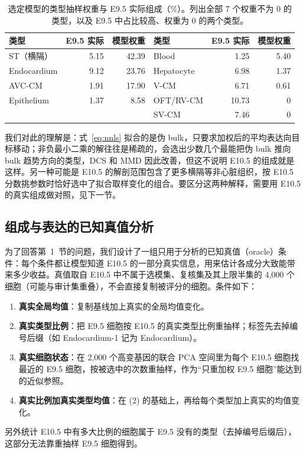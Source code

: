 \documentclass[UTF8,zihao=-4,fontset=none,a4paper]{ctexart}
\newcommand{\smalltable}{\small\renewcommand{\arraystretch}{1.2}}
\begin{document}
\begin{table}[t]
\centering\smalltable
\caption{选定模型的类型抽样权重与 E9.5 实际组成（\%）。列出全部 7 个权重不为 0 的类型，以及 E9.5 中占比较高、权重为 0 的两个类型。}\label{tab:weights}
\begin{tabular}{@{}lrr@{\hspace{2.2em}}lrr@{}}
\toprule
类型 & E9.5 实际 & 模型权重 & 类型 & E9.5 实际 & 模型权重\\
\midrule
ST（横隔） & 5.15 & 42.39 & Blood & 1.25 & 5.40\\
Endocardium & 9.12 & 23.76 & Hepatocyte & 6.98 & 1.37\\
AVC-CM & 1.91 & 17.90 & V-CM & 6.71 & 0.61\\
Epithelium & 1.37 & 8.58 & OFT/RV-CM & 10.73 & 0\\
 & & & SV-CM & 7.46 & 0\\
\bottomrule
\end{tabular}
\end{table}

我们对此的理解是：式~\eqref{eq:nnls} 拟合的是伪 bulk，只要求加权后的平均表达向目标移动；非负最小二乘的解往往是稀疏的，会选出少数几个最能把伪 bulk 推向 bulk 趋势方向的类型，DCS 和 MMD 因此改善，但这不说明 E10.5 的组成就是这样。另一种可能是 E10.5 的解剖范围包含了更多横隔等非心脏组织，按 E10.5 分数挑参数时恰好选中了拟合取样变化的组合。要区分这两种解释，需要用 E10.5 的真实组成做对照，见下一节。

\subsection{组成与表达的已知真值分析}\label{sec:oracle}

为了回答第~1~节的问题，我们设计了一组只用于分析的已知真值（oracle）条件：每个条件都让模型知道 E10.5 的一部分真实信息，用来估计各成分大致能带来多少收益。真值取自 E10.5 中不属于选模集、复核集及其上限半集的 4,000 个细胞（可能与审计集重叠），不会直接复制被评分的细胞。条件如下：
\begin{enumerate}[label=(\arabic*)]
  \item \textbf{真实全局均值}：复制基线加上真实的全局均值变化。
  \item \textbf{真实类型比例}：把 E9.5 细胞按 E10.5 的真实类型比例重抽样；标签先去掉编号后缀（如 Endocardium-1 记为 Endocardium）。
  \item \textbf{真实细胞状态}：在 2,000 个高变基因的联合 PCA 空间里为每个 E10.5 细胞找最近的 E9.5 细胞，按被选中的次数重抽样，作为“只重加权 E9.5 细胞”能达到的近似参照。
  \item \textbf{真实比例加真实类型均值}：在 (2) 的基础上，再给每个类型加上真实的均值变化。
\end{enumerate}
另外统计 E10.5 中有多大比例的细胞属于 E9.5 没有的类型（去掉编号后缀后），这部分无法靠重抽样 E9.5 细胞得到。
\end{document}
